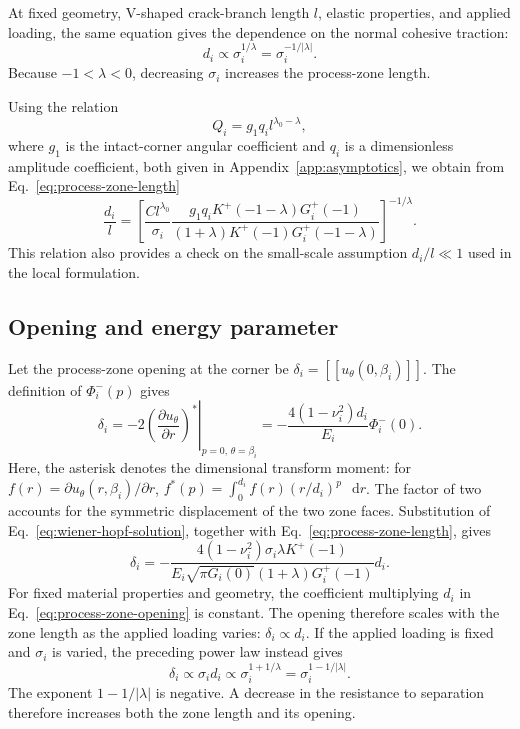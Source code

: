 \documentclass[pdflatex,iicol,sn-mathphys-ay]{sn-jnl}
\newcommand{\dd}{\mathop{}\!\mathrm{d}}
\newcommand{\jump}[1]{\left[\!\left[#1\right]\!\right]}
\begin{document}
At fixed geometry, V-shaped crack-branch length $l$, elastic properties,
and applied loading, the same equation gives the dependence on the normal cohesive
traction:
\begin{equation*}
  d_i\propto \sigma_i^{1/\lambda}
  =\sigma_i^{-1/|\lambda|}.
\end{equation*}
Because $-1<\lambda<0$, decreasing $\sigma_i$ increases the
process-zone length.

Using the relation
\begin{equation*}
  Q_i=g_1q_i l^{\lambda_0-\lambda},
\end{equation*}
where $g_1$ is the intact-corner angular coefficient and $q_i$ is a
dimensionless amplitude coefficient, both given in
Appendix~\ref{app:asymptotics}, we obtain from
Eq.~\eqref{eq:process-zone-length}
\begin{equation}
\label{eq:normalized-process-zone-length}
  \frac{d_i}{l}=
  \left[
    \frac{Cl^{\lambda_0}}{\sigma_i}
    \frac{g_1q_iK^+(-1-\lambda)G_i^+(-1)}
    {(1+\lambda)K^+(-1)G_i^+(-1-\lambda)}
  \right]^{-1/\lambda}.
\end{equation}
This relation also provides a check on the small-scale assumption
$d_i/l\ll1$ used in the local formulation.

\subsection{Opening and energy parameter}
\label{subsec:zone-parameters}

Let the process-zone opening at the corner be
$\delta_i=\jump{u_\theta(0,\beta_i)}$.
The definition of $\Phi_i^-(p)$ gives
\begin{equation*}
  \delta_i
  =-2
    \left.
      \left(\frac{\partial u_\theta}{\partial r}\right)^*
    \right|_{p=0,\,\theta=\beta_i}
  =-\frac{4(1-\nu_i^2)d_i}{E_i}\Phi_i^-(0).
\end{equation*}
Here, the asterisk denotes the dimensional transform moment:
for $f(r)=\partial u_\theta(r,\beta_i)/\partial r$,
$f^*(p)=\int_0^{d_i}f(r)(r/d_i)^p\,\dd r$.
The factor of two accounts for the symmetric displacement of the two
zone faces. Substitution of Eq.~\eqref{eq:wiener-hopf-solution},
together with Eq.~\eqref{eq:process-zone-length}, gives
\begin{equation}
\label{eq:process-zone-opening}
  \delta_i=
  -\frac{4(1-\nu_i^2)\sigma_i\lambda K^+(-1)}
  {E_i\sqrt{\pi G_i(0)}(1+\lambda)G_i^+(-1)}d_i.
\end{equation}
For fixed material properties and geometry, the coefficient multiplying
$d_i$ in Eq.~\eqref{eq:process-zone-opening} is constant. The opening
therefore scales with the zone length as the applied loading varies:
$\delta_i\propto d_i$. If the applied loading is fixed and $\sigma_i$
is varied, the preceding power law instead gives
\begin{equation*}
  \delta_i\propto \sigma_i d_i
  \propto \sigma_i^{1+1/\lambda}
  =\sigma_i^{1-1/|\lambda|}.
\end{equation*}
The exponent $1-1/|\lambda|$ is negative. A decrease in the resistance
to separation therefore increases both the zone length and its opening.
\end{document}
